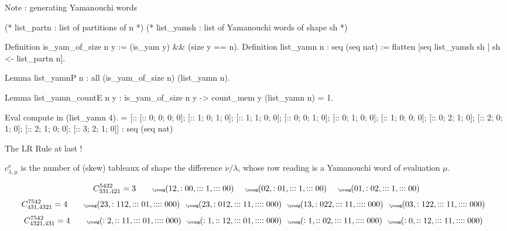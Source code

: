 \documentclass[compress,11pt]{beamer}
\begin{document}
\begin{frame}[fragile]{Note : generating Yamanouchi words}
  \begin{coqcode}
(* list_partn : list of partitions of n *)
(* list_yamsh : list of Yamanouchi words of shape sh *)

Definition is_yam_of_size n y := (is_yam y) && (size y == n).
Definition list_yamn n : seq (seq nat) :=
  flatten [seq list_yamsh sh | sh <- list_partn n].

Lemma list_yamnP n :
  all (is_yam_of_size n) (list_yamn n).

Lemma list_yamn_countE n y :
  is_yam_of_size n y -> count_mem y (list_yamn n) = 1.

Eval compute in (list_yamn 4).
     = [:: [:: 0; 0; 0; 0]; [:: 1; 0; 1; 0]; [:: 1; 1; 0; 0];
           [:: 0; 0; 1; 0]; [:: 0; 1; 0; 0]; [:: 1; 0; 0; 0];
           [:: 0; 2; 1; 0]; [:: 2; 0; 1; 0]; [:: 2; 1; 0; 0]; [::
           3; 2; 1; 0]]
     : seq (seq nat)
\end{coqcode} 
\end{frame}

\begin{frame}{The LR Rule at last !}

  \begin{THEO}
    $c_{\lambda, \mu}^{\nu}$ is the number of (skew) tableaux of shape the
    difference $\nu/\lambda$, whose row reading is a Yamanouchi word of
    evaluation $\mu$.
  \end{THEO}
  \[
  C_{331,421}^{5432} = 3
  \qquad \tiny
  \young(12,:00,:::1,:::00)\qquad
  \young(02,:01,:::1,:::00)\qquad
  \young(01,:02,:::1,:::00)
  \]
  \[
  C_{431,4321}^{7542} = 4
  \qquad \tiny
  \young(23,:112,:::01,::::000)\quad
  \young(23,:012,:::11,::::000)\quad
  \young(13,:022,:::11,::::000)\quad
  \young(03,:122,:::11,::::000)\quad
  \]
  \[
  C_{4321,431}^{7542} = 4
  \qquad \tiny
  \young(:2,::11,:::01,::::000)\quad
  \young(:1,::12,:::01,::::000)\quad
  \young(:1,::02,:::11,::::000)\quad
  \young(:0,::12,:::11,::::000)\quad
  \]

\end{frame}
\end{document}
